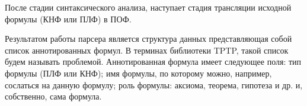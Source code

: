 \documentclass[a4paper]{jctart15b}
\begin{document}
После стадии синтаксического анализа, наступает стадия трансляции исходной формулы (КНФ или ПЛФ) в ПОФ. %

Результатом работы парсера является структура данных представляющая собой список аннотированных формул. В терминах библиотеки TPTP, такой список будем называть проблемой. Аннотированная формула имеет следующее поля: тип формулы (ПЛФ или КНФ); имя формулы, по которому можно, например, сослаться на данную формулу; роль формулы: аксиома, теорема, гипотеза и др. и, собственно, сама формула.





\end{document}
